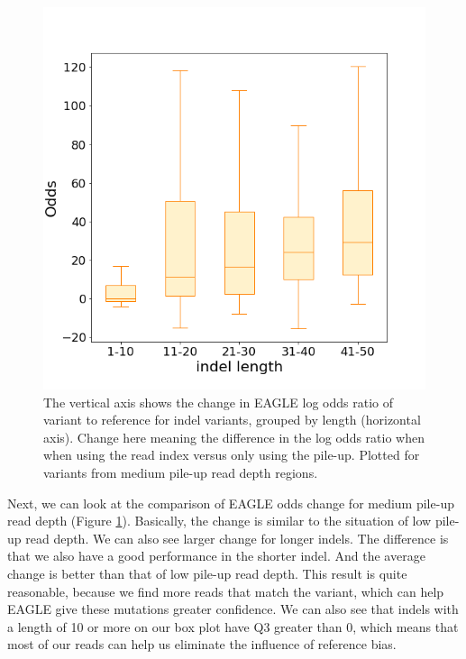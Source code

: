 \begin{figure}[H]
\centering
\includegraphics[width=0.6\columnwidth]{body/image/mid_odds_change.png}
\caption[medium pile-up read depth odds change ratio]{The vertical axis shows the change in EAGLE log odds ratio of variant to reference for indel variants, grouped by length (horizontal axis).  Change here meaning the difference in the log odds ratio when when using the read index versus only using the pile-up.  Plotted for variants from medium pile-up read depth regions.}
\label{mid_odds_change}
\end{figure}

Next, we can look at the comparison of EAGLE odds change for medium pile-up read depth (Figure \ref{mid_odds_change}). Basically, the change is similar to the situation of low pile-up read depth. We can also see larger change for longer indels. The difference is that we also have a good performance in the shorter indel. And the average change is better than that of low pile-up read depth. This result is quite reasonable, because we find more reads that match the variant, which can help EAGLE give these mutations greater confidence.
We can also see that indels with a length of 10 or more on our box plot have Q3 greater than 0, which means that most of our reads can help us eliminate the influence of reference bias.

